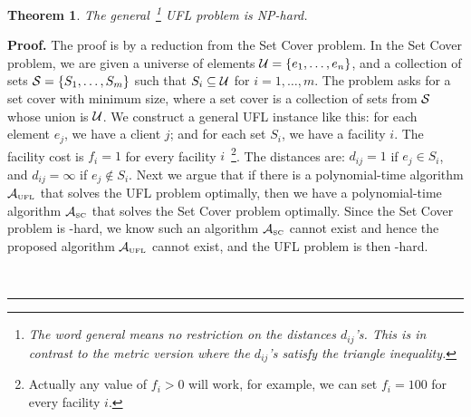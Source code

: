 \documentclass[oneside,final]{ucr}
\newtheorem{theorem}{Theorem}
\newenvironment{proof}[1][Proof]{\textbf{#1.} }{\ \rule{0.5em}{0.5em}}
\begin{document}
\begin{theorem}\label{thm:UFLNP}
  The general~\footnote{The word \emph{general} means no
    restriction on the distances $d_{ij}$'s. This is in
    contrast to the \emph{metric} version where the
    $d_{ij}$'s satisfy the triangle inequality.} UFL problem
  is NP-hard.
\end{theorem}
\begin{proof}
  The proof is by a reduction from the Set Cover problem. In
  the Set Cover problem, we are given a universe of
  elements $\calU = \{e_1, \ldots, e_n\}$, and a collection
  of sets $\calS = \{S_1, \ldots, S_m\}$ such that $S_i
  \subseteq \calU$ for $i=1,\ldots,m$. The problem asks for
  a set cover with minimum size, where a set cover is a
  collection of sets from $\calS$ whose union is $\calU$. We
  construct a general UFL instance like this: for each
  element $e_j$, we have a client $j$; and for each set
  $S_i$, we have a facility $i$. The facility cost is
  $f_i=1$ for every facility $i$~\footnote{Actually any
    value of $f_i > 0$ will work, for example, we can set
    $f_i=100$ for every facility $i$.}. The distances are:
  $d_{ij} = 1$ if $e_j \in S_i$, and $d_{ij} = \infty$ if
  $e_j \notin S_i$. Next we argue that if there is a
  polynomial-time algorithm $\calA_{\smallUFL}$ that solves
  the UFL problem optimally, then we have a polynomial-time
  algorithm $\calA_{\smallSC}$ that solves the Set Cover
  problem optimally. Since the Set Cover problem is
  \NP-hard, we know such an algorithm $\calA_{\smallSC}$
  cannot exist and hence the proposed algorithm
  $\calA_{\smallUFL}$ cannot exist, and the UFL problem is
  then \NP-hard.


\end{proof}
\end{document}

